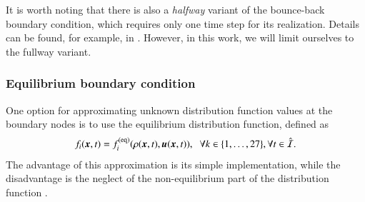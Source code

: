 It is worth noting that there is also a \textit{halfway} variant of the bounce-back boundary condition, which requires only one time step for its realization. Details can be found, for example, in \cite{Kruger}. However, in this work, we will limit ourselves to the fullway variant.

\subsubsection{Equilibrium boundary condition}\label{equilibrium bc}
One option for approximating unknown distribution function values at the boundary nodes is to use the equilibrium distribution function, defined as \cite{PE}
\begin{equation}
	f_i(\vec{x}, t)=f_{i}^{\text{(eq)}}(\rho(\vec{x}, t), \vec{u}(\vec{x}, t)), \hspace{2mm}  \forall k \in \{1,\dots,27\}, \forall t \in \hat{\mathcal{I}}.
\end{equation}
The advantage of this approximation is its simple implementation, while the disadvantage is the neglect of the non-equilibrium part of the distribution function \cite{PE}.

